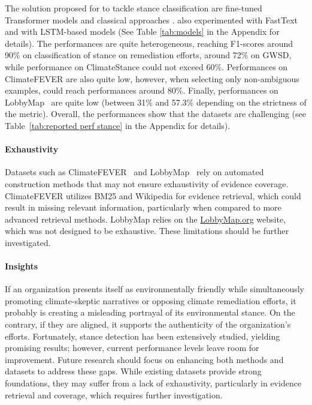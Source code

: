\solutions The solution proposed for to tackle stance classification are fine-tuned Transformer models \cite{vaid-etal-2022-towards, vaghefi2022deep, xiang_dare_2023, morio2023an, nicolas_webersinke_climatebert_2021, Wang2021EvidenceBA, spokoyny2023answering, lai_using_2023, luo_detecting_2020} and classical approaches \cite{spokoyny2023answering, morio2023an, luo_detecting_2020}. \citet{vaid-etal-2022-towards} also experimented with FastText and \citet{xiang_dare_2023} with LSTM-based models (See Table \ref{tab:models} in the Appendix for details). The performances are quite heterogeneous, \citet{lai_using_2023} reaching F1-scores around 90\% on classification of stance on remediation efforts, \citet{luo_detecting_2020} around 72\% on GWSD, while performance on ClimateStance could not exceed 60\%. Performances on ClimateFEVER are also quite low, however, when selecting only non-ambiguous examples, \citet{xiang_dare_2023} could reach performances around 80\%. Finally, performances on LobbyMap~\cite{morio2023an} are quite low (between 31\% and 57.3\% depending on the strictness of the metric). Overall, the performances show that the datasets are challenging (see Table~\ref{tab:reported perf stance} in the Appendix for details).

\paragraph{Exhaustivity} %
Datasets such as ClimateFEVER~\cite{diggelmann_climate-fever_2020} and LobbyMap~\cite{morio2023an} rely on automated construction methods that may not ensure exhaustivity of evidence coverage. ClimateFEVER utilizes BM25 and Wikipedia for evidence retrieval, which could result in missing relevant information, particularly when compared to more advanced retrieval methods. LobbyMap relies on the \url{LobbyMap.org} website, which was not designed to be exhaustive. These limitations should be further investigated.

\paragraph{Insights} If an organization presents itself as environmentally friendly while simultaneously promoting climate-skeptic narratives or opposing climate remediation efforts, it probably is creating a misleading portrayal of its environmental stance. On the contrary, if they are aligned, it supports the authenticity of the organization's efforts.
Fortunately, stance detection has been extensively studied, yielding promising results; however, current performance levels leave room for improvement. Future research should focus on enhancing both methods and datasets to address these gaps.
While existing datasets provide strong foundations, they may suffer from a lack of exhaustivity, particularly in evidence retrieval and coverage, which requires further investigation. %

